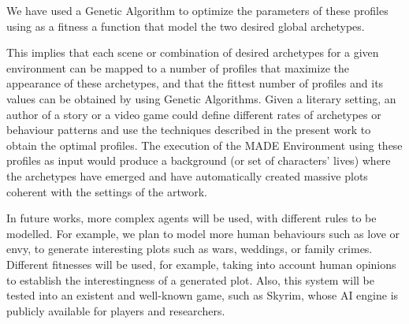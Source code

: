 \documentclass{sig-alternate}
\begin{document}

We have used a
Genetic Algorithm to optimize the parameters of these profiles using
as a fitness a function that model the two desired global
archetypes. %

This implies that each scene or combination of desired archetypes for a given
environment can be mapped to a number of profiles that maximize the appearance
of these archetypes, and that the fittest number of profiles and its values can
be obtained by using Genetic Algorithms.  
Given a literary setting, an author of a story or a video game could define 
different rates of archetypes or behaviour patterns and use the techniques described in
the present work to obtain the optimal profiles. The execution of the MADE Environment
using these profiles as input would produce a background (or set of characters' lives)
where the archetypes have emerged and have automatically created massive plots coherent
with the settings of the artwork.

In future works, more complex agents will be used, with different rules to be modelled. For example, we plan to model more human behaviours such as love or envy, to generate interesting plots such as wars, weddings, or family crimes. Different fitnesses will be used, for example, taking into account human opinions to establish the interestingness of a generated plot. Also, this system will be tested into an existent and well-known game, such as Skyrim\texttrademark, whose AI engine is publicly available for players and researchers.
\end{document}
